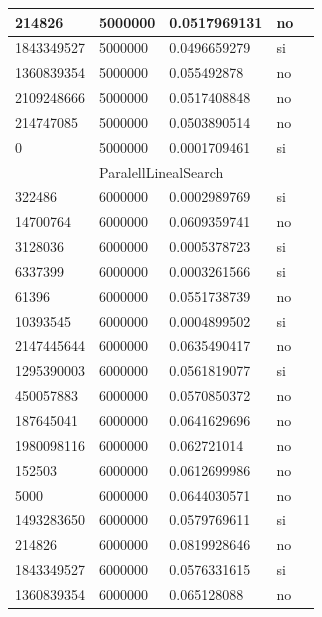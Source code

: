 \documentclass[12pt, fleqn]{article}                             %
\theoremstyle{break}                                            %
\begin{document}
\begin{longtable}{|m{5em}|m{5em}|m{10em}|m{5em}|@{}m{0pt}@{}}
            214826& 5000000  & 0.0517969131 & no &\\[1em]    \hline
            1843349527& 5000000  & 0.0496659279 & si &\\[1em]    \hline
            1360839354& 5000000  & 0.055492878 & no &\\[1em]    \hline
            2109248666& 5000000  & 0.0517408848 & no &\\[1em]    \hline
            214747085& 5000000  & 0.0503890514 & no &\\[1em]    \hline
            0& 5000000  & 0.0001709461 & si &\\[1em]    \hline
            \multicolumn{5}{|c|}{ParalellLinealSearch}   \\          \hline
            322486& 6000000  & 0.0002989769 & si &\\[1em]    \hline
            14700764& 6000000  & 0.0609359741 & no &\\[1em]    \hline
            3128036& 6000000  & 0.0005378723 & si &\\[1em]    \hline
            6337399& 6000000  & 0.0003261566 & si &\\[1em]    \hline
            61396& 6000000  & 0.0551738739 & no &\\[1em]    \hline
            10393545& 6000000  & 0.0004899502 & si &\\[1em]    \hline
            2147445644& 6000000  & 0.0635490417 & no &\\[1em]    \hline
            1295390003& 6000000  & 0.0561819077 & si &\\[1em]    \hline
            450057883& 6000000  & 0.0570850372 & no &\\[1em]    \hline
            187645041& 6000000  & 0.0641629696 & no &\\[1em]    \hline
            1980098116& 6000000  & 0.062721014 & no &\\[1em]    \hline
            152503& 6000000  & 0.0612699986 & no &\\[1em]    \hline
            5000& 6000000  & 0.0644030571 & no &\\[1em]    \hline
            1493283650& 6000000  & 0.0579769611 & si &\\[1em]    \hline
            214826& 6000000  & 0.0819928646 & no &\\[1em]    \hline
            1843349527& 6000000  & 0.0576331615 & si &\\[1em]    \hline
            1360839354& 6000000  & 0.065128088 & no &\\[1em]    \hline

\end{longtable}
\end{document}
